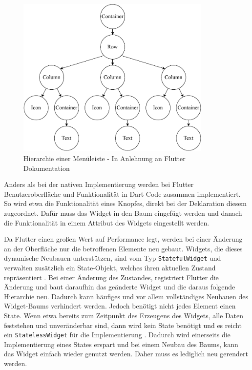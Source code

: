 \begin{figure}[ht]
  \centering
  \includegraphics[height=8cm,keepaspectratio]{images/Flutter_menu_replacement.drawio.pdf} 
  \caption[Hierarchie einer Menüleiste]{Hierarchie einer Menüleiste - In Anlehnung an Flutter Dokumentation\protect\footnotemark}
  \label{fig:flutter_layout_tree}
\end{figure}

Anders als bei der nativen Implementierung werden bei Flutter Benutzeroberfläche und Funktionalität in Dart Code zusammen implementiert. So wird etwa die Funktionalität eines Knopfes, direkt bei der Deklaration diesem zugeordnet. Dafür muss das Widget in den Baum eingefügt werden und danach die Funktionalität in einem Attribut des Widgets eingestellt werden.

Da Flutter einen großen Wert auf Performance legt, werden bei einer Änderung an der Oberfläche nur die betroffenen Elemente neu gebaut. Widgets, die dieses dynamische Neubauen unterstützen, sind vom Typ \verb|StatefulWidget| und verwalten zusätzlich ein State-Objekt, welches ihren aktuellen Zustand repräsentiert \cite[Kapitel~4]{Flutter_Recipes}. Bei einer Änderung des Zustandes, registriert Flutter die Änderung und baut daraufhin das geänderte Widget und die daraus folgende Hierarchie neu\cite{9623025}. Dadurch kann häufiges und vor allem vollständiges Neubauen des Widget-Baums verhindert werden. Jedoch benötigt nicht jedes Element einen State. Wenn etwa bereits zum Zeitpunkt des Erzeugens des Widgets, alle Daten feststehen und unveränderbar sind, dann wird kein State benötigt und es reicht ein \verb|StatelessWidget| für die Implementierung \cite[Kapitel~4]{Flutter_Recipes}. Dadurch wird einerseits die Implementierung eines States erspart und bei einem Neubau des Baums, kann das Widget einfach wieder genutzt werden. Daher muss es lediglich neu gerendert werden.

